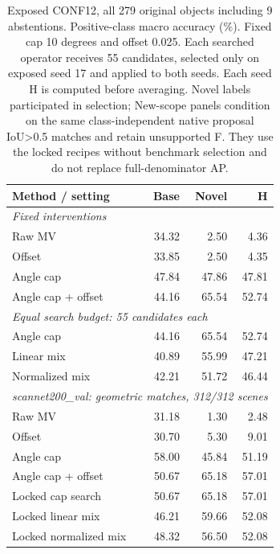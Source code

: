 \begin{table}[t]
\centering
\small
\caption{Exposed CONF12, all 279 original objects including 9 abstentions. Positive-class macro accuracy (\%). Fixed cap 10 degrees and offset 0.025. Each searched operator receives 55 candidates, selected only on exposed seed 17 and applied to both seeds. Each seed H is computed before averaging. Novel labels participated in selection; New-scope panels condition on the same class-independent native proposal IoU\textgreater{}0.5 matches and retain unsupported F. They use the locked recipes without benchmark selection and do not replace full-denominator AP.}
\label{tab:benchmark-t3}
\begin{tabular}{lrrr}
\toprule
Method / setting & Base & Novel & H \\
\midrule
\multicolumn{4}{l}{\emph{Fixed interventions}} \\
Raw MV & 34.32 & 2.50 & 4.36 \\
Offset & 33.85 & 2.50 & 4.35 \\
Angle cap & 47.84 & 47.86 & 47.81 \\
Angle cap + offset & 44.16 & 65.54 & 52.74 \\
\midrule
\multicolumn{4}{l}{\emph{Equal search budget: 55 candidates each}} \\
Angle cap & 44.16 & 65.54 & 52.74 \\
Linear mix & 40.89 & 55.99 & 47.21 \\
Normalized mix & 42.21 & 51.72 & 46.44 \\
\midrule
\multicolumn{4}{l}{\emph{scannet200\_val: geometric matches, 312/312 scenes}} \\
Raw MV & 31.18 & 1.30 & 2.48 \\
Offset & 30.70 & 5.30 & 9.01 \\
Angle cap & 58.00 & 45.84 & 51.19 \\
Angle cap + offset & 50.67 & 65.18 & 57.01 \\
Locked cap search & 50.67 & 65.18 & 57.01 \\
Locked linear mix & 46.21 & 59.66 & 52.08 \\
Locked normalized mix & 48.32 & 56.50 & 52.08 \\
\bottomrule
\end{tabular}
\end{table}
